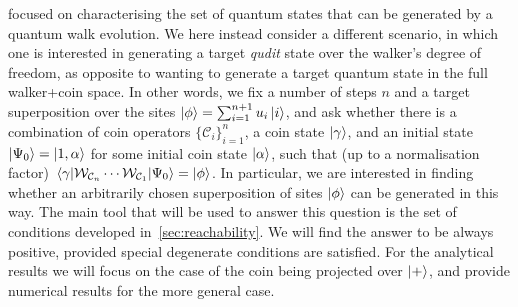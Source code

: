  focused on characterising the set of quantum states that can be generated by a quantum walk evolution.
We here instead consider a different scenario, in which one is interested in generating a target \emph{qudit} state over the walker's degree of freedom, as opposite to wanting to generate a target quantum state in the full walker+coin space.
In other words, we fix a number of steps $n$ and a target superposition over the sites $\ket\phi=\sum_{i=1}^{n+1} u_i\ket i$, and ask whether there is a combination of coin operators $\{\mathcal C_i\}_{i=1}^{n}$, a coin state $\ket\gamma$, and an initial state $\ket{\Psi_0}=\ket{1, \alpha}$ for some initial coin state $\ket\alpha$, such that (up to a normalisation factor)
$\mel{\gamma}{\mathcal W_{\mathcal C_{n}} \cdots\mathcal W_{\mathcal C_{1}}}{\Psi_0} = \ket\phi$.
In particular, we are interested in finding whether an arbitrarily chosen superposition of sites $\ket\phi$ can be generated in this way.
The main tool that will be used to answer this question is the set of conditions developed in~\cref{sec:reachability}.
We will find the answer to be always positive, provided special degenerate conditions are satisfied.
For the analytical results we will focus on the case of the coin being projected over $\ket+$,
and provide numerical results for the more general case.


